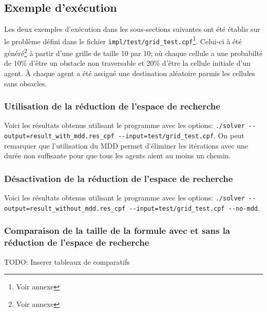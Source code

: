 \documentclass[french, 12pt, letterpaper]{article}
\theoremstyle{definition}
\theoremstyle{proposition}
\theoremstyle{example}
\begin{document}
    

    \subsection{Exemple d'exécution}
    \label{sec:example}

    Les deux exemples d'exécution dans les sous-sections suivantes ont été établis sur le problème défini dans le fichier
    \lstinline{impl/test/grid_test.cpf}\footnote{Voir annexe }. Celui-ci à été généré\footnote{Voir annexe } à partir d'une grille de taille 10 par 10;
    où chaque cellule a une probabilté de 10\% d'être un obstacle non traversable et 20\% d'être la cellule initiale d'un agent.
    À chaque agent a été assigné une destination aléatoire parmis les cellules sans obsacles.

    \subsubsection{Utilisation de la réduction de l'espace de recherche}

    Voici les résultats obtenus utilisant le programme avec les options: \lstinline{./solver --output=result_with_mdd.res_cpf --input=test/grid_test.cpf}.
    On peut remarquer que l'utilisation du MDD permet d'éliminer les itérations avec une durée non suffisante pour que tous les agents aient au moins un chemin.

    

    \subsubsection{Désactivation de la réduction de l'espace de recherche}

    Voici les résultats obtenus utilisant le programme avec les options: \lstinline{./solver --output=result_without_mdd.res_cpf --input=test/grid_test.cpf --no-mdd}.

    

    \subsubsection{Comparaison de la taille de la formule avec et sans la réduction de l'espace de recherche}
    \label{sec:compartaille}
    
    TODO: Inserer tableaux de comparatifs
\end{document}
